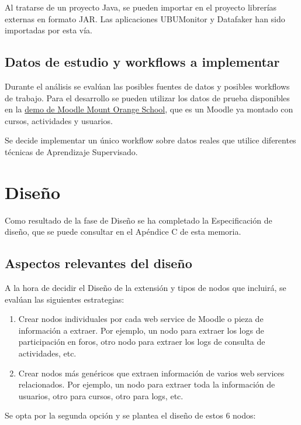 Al tratarse de un proyecto Java, se pueden importar en el proyecto librerías externas en formato JAR. Las aplicaciones UBUMonitor y Datafaker 
han sido importadas por esta vía. 


\subsection{Datos de estudio y workflows a implementar}

Durante el análisis se evalúan las posibles fuentes de datos y posibles workflows de trabajo. Para el desarrollo se pueden 
utilizar los datos de prueba disponibles en la \href{https://school.moodledemo.net/}{demo de Moodle Mount Orange School}, que es un 
Moodle ya montado con cursos, actividades y usuarios. 
\

Se decide implementar un único workflow sobre datos reales que utilice diferentes técnicas de Aprendizaje Supervisado. 

\newpage
\section{Diseño}

Como resultado de la fase de Diseño se ha completado la Especificación de diseño, que se puede consultar en el Apéndice C de esta memoria. 

\subsection{Aspectos relevantes del diseño}

A la hora de decidir el Diseño de la extensión y tipos de nodos que incluirá, se evalúan las siguientes estrategias: 

\begin{enumerate}
	\item Crear nodos individuales por cada web service de Moodle o pieza de información a extraer. Por ejemplo, un nodo 
	para extraer los logs de participación en foros, otro nodo para extraer los logs de consulta de actividades, etc. 
	\item Crear nodos más genéricos que extraen información de varios web services relacionados. Por ejemplo, 
	un nodo para extraer toda la información de usuarios, otro para cursos, otro para logs, etc. 
\end{enumerate}

Se opta por la segunda opción y se plantea el diseño de estos 6 nodos: 

